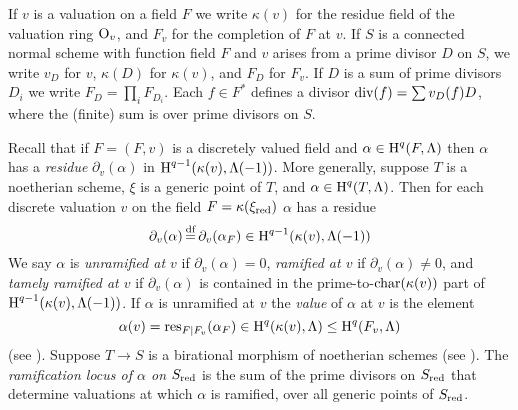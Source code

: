 \documentclass{amsart}
\theoremstyle{plain}
\theoremstyle{definition}
\theoremstyle{remark}
\numberwithin{equation}{section}%
\renewcommand{\H}{{\text{\rm H}}}
\renewcommand{\O}{{\text{\rm O}}}
\newcommand{\df}{{\,\overset{\text{\rm df}}{=}\,}}
\renewcommand{\div}{{\text{\rm div}}}
\newcommand{\red}{{\text{\rm red}}}
\newcommand{\res}{{\text{\rm res}}}
\begin{document}
If $v$ is a valuation on a field $F$ we write $\kappa(v)$ for
the residue field of the valuation ring $\O_v$, and $F_v$ for the completion of $F$
at $v$.  
If $S$ is a connected normal scheme with function field $F$ 
and $v$ arises from a prime divisor $D$ on $S$,
we write $v_D$ for $v$, $\kappa(D)$ for $\kappa(v)$, and $F_D$ for $F_v$.
If $D$ is a sum of prime divisors $D_i$ we write
$F_D=\prod_i F_{D_i}$.
Each $f\in F^*$ defines a divisor $\div(f)=\sum v_D(f)D$,
where the (finite) sum is over prime divisors on $S$.

Recall that if $F=(F,v)$ is a discretely valued field and $\alpha\in\H^q(F,\Lambda)$
then $\alpha$ has a {\it residue} $\partial_v(\alpha)$ in $\H^{q-1}(\kappa(v),\Lambda(-1))$.
%
More generally,
suppose $T$ is a noetherian scheme,
$\xi$ is a generic point of $T$, and $\alpha\in\H^q(T,\Lambda)$.
Then for each discrete valuation $v$ on the field $F=\kappa(\xi_\red)$
$\alpha$ has a residue 
$$
\partial_v(\alpha)\df\partial_v(\alpha_F)\in\H^{q-1}(\kappa(v),\Lambda(-1))
$$
We say $\alpha$ is {\it unramified at $v$} if $\partial_v(\alpha)=0$, {\it ramified at $v$}
if $\partial_v(\alpha)\neq 0$, and {\it tamely ramified at $v$} if $\partial_v(\alpha)$
is contained in the prime-to-$\text{\rm char}(\kappa(v))$ part of $\H^{q-1}(\kappa(v),\Lambda(-1))$.
If $\alpha$ is unramified at $v$ the {\it value} of $\alpha$ at $v$ is the
element 
$$
\alpha(v)=\res_{F|F_v}(\alpha_F)\in\H^q(\kappa(v),\Lambda)
\leq\H^q(F_v,\Lambda)
$$
(see \cite[7.13, p.19]{GMS}).
Suppose $T\to S$ is a birational morphism of noetherian schemes (see \cite[I.2.2.9]{EGAI}).
The {\it ramification locus of $\alpha$ on $S_\red$}
is the sum of the prime divisors on $S_\red$ that determine valuations at
which $\alpha$ is ramified, over all generic points of $S_\red$.
\end{document}

